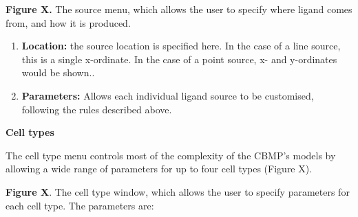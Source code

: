 \documentclass[11.5pt]{article}
\begin{document}
\begin{figure}[H]
\centering
\end{figure}


{\bfseries Figure X. }The source menu, which allows the user to specify 
where ligand comes from, and how it is produced.

\begin{enumerate}
\item {\bfseries Location: }the source location is specified here. In the 
case of a line source, this is a single x-ordinate. In the case of a 
point source, x- and y-ordinates would be shown..
\item {\bfseries Parameters: }Allows each individual ligand source to be 
customised, following the rules described above.
\setcounter{numberedCntB}{\theenumi}
\end{enumerate}




{\bfseries Cell types}

The cell type menu controls most of the complexity of the CBMP's models 
by allowing a wide range of parameters for up to four cell types (Figure 
X). 

\begin{figure}[H]
\centering
\end{figure}


{\bfseries Figure X}. The cell type window, which allows the user to 
specify parameters for each cell type. The parameters are:
\end{document}
